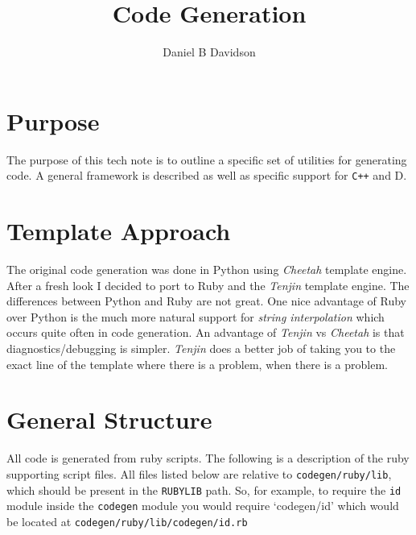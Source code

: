 \documentclass[11pt]{article}
\title{Code Generation}
\author{Daniel B Davidson}
\date{}
\begin{document}
\maketitle



\section{Purpose}
\label{sec-1}

  
  The purpose of this tech note is to outline a specific set of
  utilities for generating code. A general framework is described as
  well as specific support for \texttt{C++} and D.

\section{Template Approach}
\label{sec-2}


  The original code generation was done in Python using \emph{Cheetah}
  template engine. After a fresh look I decided to port to Ruby and
  the \emph{Tenjin} template engine. The differences between Python and
  Ruby are not great. One nice advantage of Ruby over Python is the
  much more natural support for \emph{string interpolation} which occurs
  quite often in code generation. An advantage of \emph{Tenjin} vs
  \emph{Cheetah} is that diagnostics/debugging is simpler. \emph{Tenjin} does a
  better job of taking you to the exact line of the template where
  there is a problem, when there is a problem.

\section{General Structure}
\label{sec-3}


  All code is generated from ruby scripts. The following is a
  description of the ruby supporting script files. All files listed
  below are relative to \texttt{codegen/ruby/lib}, which should be present in
  the \texttt{RUBYLIB} path. So, for example, to require the \texttt{id} module
  inside the \texttt{codegen} module you would require `codegen/id' which
  would be located at \texttt{codegen/ruby/lib/codegen/id.rb}

  
\end{document}

